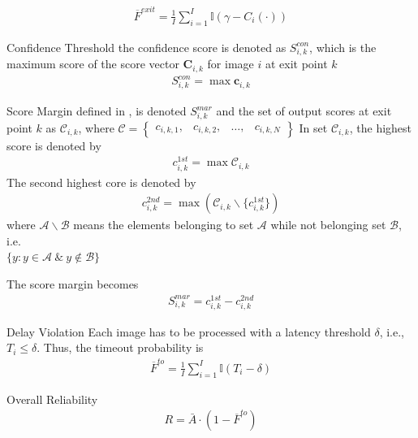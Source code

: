 \begin{enumdescript}
\begin{enumdescript}
\begin{enumdescript}
\begin{align}
			\overline{F}^{exit} = \frac{1}{I}\sum_{i=1}^{I} \mathbb{I} \left(\gamma-C_i\left(\cdot\right)\right)
			\end{align}
				\begin{enumdescript}
					\item[Confidence Threshold] the confidence score \cite{leroux_resource-constrained_2015} is denoted as $ S_{i,k}^{con} $, which is the maximum score of the score vector $ \mathbf{C}_{i,k} $ for image $ i $ at exit point $ k $ 
					\begin{align}
					S_{i,k}^{con} = \max \mathbf{c}_{i,k}
					\end{align}
					\item[Score Margin] defined in \cite{park_big/little_2015}, is denoted $ S_{i,k}^{mar} $ and the set of output scores at exit point $ k $ as $ \mathcal{C}_{i,k} $, where $ \mathcal{C} = \left\{ \begin{array}{cccc}
					c_{i,k,1}, & c_{i,k,2}, & \dots , & c_{i,k,N} \end{array}\right\}$
					In set $ \mathcal{C}_{i,k}$,  the highest score is denoted by 
					\begin{align}
					c_{i,k}^{1st}=\max \mathcal{C}_{i,k}
					\end{align}
					The second highest core is denoted by
					\begin{align}
					c_{i,k}^{2nd}=\max \left(\mathcal{C}_{i,k}\backslash \{c_{i,k}^{1st}\}\right)
					\end{align}
					where $\mathcal{A}\backslash\mathcal{B}$ means the elements belonging to set $ \mathcal{A} $ while not belonging set $ \mathcal{B} $, i.e. \\ $ \{y \colon y \in \mathcal{A}\: \&\: y \notin \mathcal{B}\} $
					
					The score margin becomes
					\begin{align}
					S_{i,k}^{mar} = c_{i,k}^{1st} - c_{i,k}^{2nd}
					\end{align}
					
				\end{enumdescript}
			\item[Delay Violation] Each image has to be processed with a latency threshold $ \delta $, i.e., $ T_{i} \leq \delta $. Thus, the timeout probability is
			\begin{align}
			\overline{F}^{to}=\frac{1}{I}\sum_{i=1}^{I} \mathbb{I}\left(T_{i}-\delta\right)
			\end{align}
			\item[Overall Reliability]\begin{align}
			R= \bar{A} \cdot (1-\overline{F}^{to})
			\end{align}
			
		\end{enumdescript}
		
		
	\end{enumdescript}
\end{enumdescript} 


